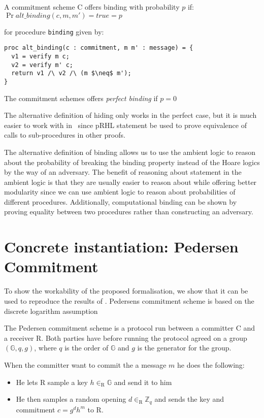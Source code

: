 \begin{definition}
  \label{def:commitment:alt-binding}
  A commitment scheme C offers binding with probability $p$ if:
  $\Pr{alt\_{binding}(c, m, m') = true} = p$

  for procedure \texttt{binding} given by:
\begin{lstlisting}[mathescape]
proc alt_binding(c : commitment, m m' : message) = {
  v1 = verify m c;
  v2 = verify m' c;
  return v1 /\ v2 /\ (m $\neq$ m');
}
\end{lstlisting}

  The commitment schemes offers \textit{perfect binding} if $p = 0$
\end{definition}

The alternative definition of hiding only works in the perfect case, but it is much easier
to work with in \easycrypt\  since pRHL statement be used to prove
equivalence of calls to sub-procedures in other proofs.

The alternative definition of binding allows us to use the ambient logic to
reason about the probability of breaking the binding property instead of the
Hoare logics by the way of an adversary.
The benefit of reasoning about
statement in the ambient logic is that they are usually easier to reason about
while offering better modularity since we can use ambient logic to
reason about probabilities of different procedures.
Additionally, computational binding can be shown by proving equality between two
procedures rather than constructing an adversary.


\section{Concrete instantiation: Pedersen Commitment}
\label{sec:pedersen}

To show the workability of the proposed formalisation, we show that it can be
used to reproduce the results of \citet{DBLP:journals/corr/MetereD17}. Pedersens
commitment scheme is based on the discrete logarithm assumption

The Pedersen commitment scheme is a protocol run between a committer C and a
receiver R. Both parties have before running the protocol agreed on a group
$(\mathbb{G}, q, g)$, where $q$ is the order of $\mathbb{G}$ and $g$ is the
generator for the group.

When the committer want to commit the a message $m$ he does the following:
\begin{itemize}
  \item He lets R sample a key $h \in_{\text{R}} \mathbb{G}$ and send it to him
  \item He then samples a random opening $d \in_{\text{R}} \mathbb{Z}_{q}$ and sends the
    key and commitment $c = g^{d}h^{m}$ to R.
\end{itemize}


